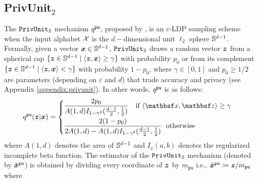 \subsection{\texorpdfstring{PrivUnit$_2$}{PrivUnit}}
The $\texttt{PrivUnit}_2$ mechanism $q^{\texttt{pu}}$, proposed by \cite{BDFKR2018}, is an $\varepsilon$-LDP sampling scheme when the input alphabet $\mathcal{X}$ is the $d-$dimensional unit $\ell_2$ sphere $\mathbb{S}^{d-1}$. Formally, given a vector ${\boldsymbol{x}} \in \mathbb{S}^{d-1}$, $\texttt{PrivUnit}_2$ draws a random vector ${\boldsymbol{z}}$ 
from a spherical cap $\{{\boldsymbol{z}} \in \mathbb{S}^{d-1} \mid
\langle {\boldsymbol{z}}, {\boldsymbol{x}}  \rangle \ge \gamma\}$ with probability $p_0$ or from its complement $\{{\boldsymbol{z}} \in \mathbb{S}^{d-1} \mid \langle {\boldsymbol{z}}, {\boldsymbol{x}} \rangle < \gamma\}$  with probability $1 - p_0$, 
where $\gamma \in [0, 1]$ and $p_0  \geq 1/2$ are parameters (depending on $\varepsilon$ and $d$) that trade accuracy and privacy (see Appendix \ref{appendix:privunit}). In other words, $q^{\texttt{pu}}$ is as follows:
\begin{align}
    \qPU(\svbz | \svbx)   =   
    \begin{cases}
        \dfrac{2 p_0}{A(1,d)I_{1-\gamma^2}(\frac{d-1}{2},\frac{1}{2})} \hspace{10pt} \text{if}\ \langle \rvbx, \rvbz \rangle \geq \gamma \\[10pt]
       \dfrac{2(1-p_0)}{2A(1,d)  -  A(1,d)I_{1-\gamma^2}(\frac{d-1}{2},\frac{1}{2})} \hspace{6pt} \text{otherwise}
    \end{cases}
\end{align}
where $A(1,d)$ denotes the area of $\mathbb{S}^{d-1}$ and $I_x(a,b)$ denotes the regularized incomplete beta function. The estimator of the $\texttt{PrivUnit}_2$ mechanism (denoted by $\hat{{\boldsymbol{x}}}^{\texttt{pu}}$) is obtained by dividing every coordinate of ${\boldsymbol{z}}$ by $m_{\texttt{pu}}$ i.e., $\hat{{\boldsymbol{x}}}^{\texttt{pu}} \coloneqq {\boldsymbol{z}}/m_{\texttt{pu}}$ where 
